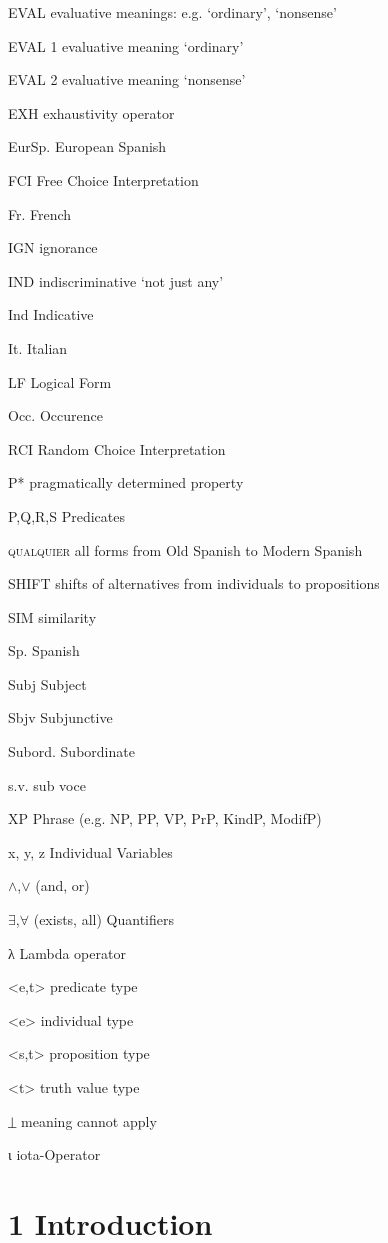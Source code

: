 EVAL   evaluative meanings: e.g. ‘ordinary’, ‘nonsense’

EVAL 1   evaluative meaning ‘ordinary’

EVAL 2   evaluative meaning ‘nonsense’

EXH     exhaustivity operator

EurSp.  European Spanish

FCI     Free Choice Interpretation

Fr.    French

IGN    ignorance

IND    indiscriminative ‘not just any’

Ind    Indicative

It.    Italian

LF    Logical Form

Occ.    Occurence

RCI      Random Choice Interpretation

P*     pragmatically determined property 

P,Q,R,S   Predicates

\textsc{qualquier}   all forms from Old Spanish to Modern Spanish 

SHIFT   shifts of alternatives from individuals to propositions

SIM     similarity

Sp.    Spanish

Subj    Subject

Sbjv    Subjunctive

Subord.  Subordinate

s.v.    sub voce

XP     Phrase (e.g. NP, PP, VP, PrP, KindP, ModifP)

x, y, z   Individual Variables 

${\wedge}$,${\vee}$      (and, or) 

${\exists}$,${\forall}$     (exists, all) Quantifiers

λ     Lambda operator

<e,t>     predicate type

<e>     individual type

<s,t>     proposition type

<t>     truth value type

⏊    meaning cannot apply

ι     iota-Operator

\chapter{1 Introduction}

